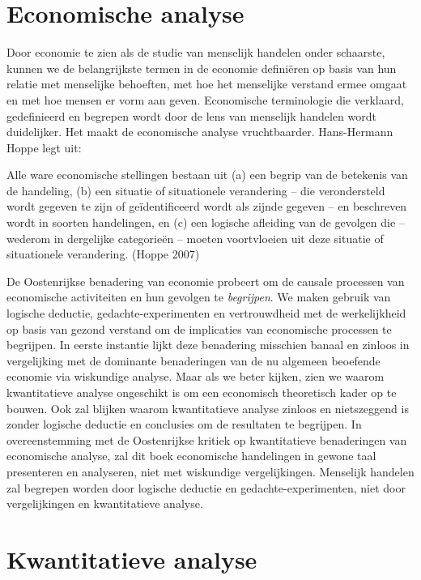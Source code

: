 \documentclass[
  a5paper,
  smalldemyvopaper,11pt,twoside,onecolumn,openright,extrafontsizes,
hidelinks]{memoir}
\begin{document}
\section{Economische analyse}\label{economische-analyse}

Door economie te zien als de studie van menselijk handelen onder
schaarste, kunnen we de belangrijkste termen in de economie definiëren
op basis van hun relatie met menselijke behoeften, met hoe het
menselijke verstand ermee omgaat en met hoe mensen er vorm aan geven.
Economische terminologie die verklaard, gedefinieerd en begrepen wordt
door de lens van menselijk handelen wordt duidelijker. Het maakt de
economische analyse vruchtbaarder. Hans-Hermann Hoppe legt uit:

Alle ware economische stellingen bestaan uit (a) een begrip van de
betekenis van de handeling, (b) een situatie of situationele verandering
-- die verondersteld wordt gegeven te zijn of geïdentificeerd wordt als
zijnde gegeven -- en beschreven wordt in soorten handelingen, en (c) een
logische afleiding van de gevolgen die -- wederom in dergelijke
categorieën -- moeten voortvloeien uit deze situatie of situationele
verandering. (Hoppe 2007)

De Oostenrijkse benadering van economie probeert om de causale processen
van economische activiteiten en hun gevolgen te \emph{begrijpen}. We
maken gebruik van logische deductie, gedachte-experimenten en
vertrouwdheid met de werkelijkheid op basis van gezond verstand om de
implicaties van economische processen te begrijpen. In eerste instantie
lijkt deze benadering misschien banaal en zinloos in vergelijking met de
dominante benaderingen van de nu algemeen beoefende economie via
wiskundige analyse. Maar als we beter kijken, zien we waarom
kwantitatieve analyse ongeschikt is om een economisch theoretisch kader
op te bouwen. Ook zal blijken waarom kwantitatieve analyse zinloos en
nietszeggend is zonder logische deductie en conclusies om de resultaten
te begrijpen. In overeenstemming met de Oostenrijkse kritiek op
kwantitatieve benaderingen van economische analyse, zal dit boek
economische handelingen in gewone taal presenteren en analyseren, niet
met wiskundige vergelijkingen. Menselijk handelen zal begrepen worden
door logische deductie en gedachte-experimenten, niet door
vergelijkingen en kwantitatieve analyse.

\section{Kwantitatieve analyse}\label{kwantitatieve-analyse}
\end{document}
